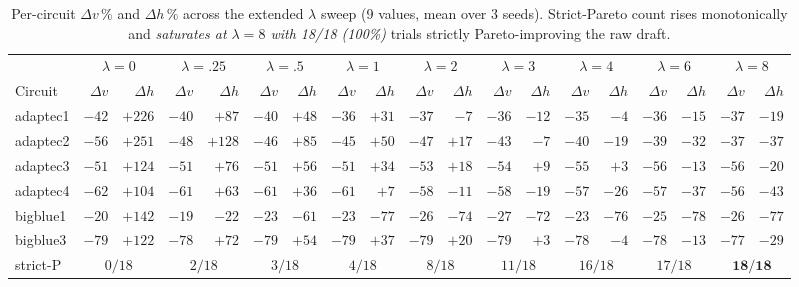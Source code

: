 \documentclass{article}
\begin{document}
\begin{table}[h]
\centering
\scriptsize
\setlength{\tabcolsep}{2pt}
\begin{tabular}{lrr|rr|rr|rr|rr|rr|rr|rr|rr}
\toprule
& \multicolumn{2}{c|}{$\lambda{=}0$} & \multicolumn{2}{c|}{$\lambda{=}.25$} &
\multicolumn{2}{c|}{$\lambda{=}.5$} & \multicolumn{2}{c|}{$\lambda{=}1$} &
\multicolumn{2}{c|}{$\lambda{=}2$} & \multicolumn{2}{c|}{$\lambda{=}3$} &
\multicolumn{2}{c|}{$\lambda{=}4$} & \multicolumn{2}{c|}{$\lambda{=}6$} &
\multicolumn{2}{c}{$\lambda{=}8$} \\
Circuit & $\Delta v$ & $\Delta h$ & $\Delta v$ & $\Delta h$ &
$\Delta v$ & $\Delta h$ & $\Delta v$ & $\Delta h$ &
$\Delta v$ & $\Delta h$ & $\Delta v$ & $\Delta h$ &
$\Delta v$ & $\Delta h$ & $\Delta v$ & $\Delta h$ &
$\Delta v$ & $\Delta h$ \\
\midrule
adaptec1 & $-42$ & $+226$ & $-40$ & $+87$ & $-40$ & $+48$ & $-36$ & $+31$ & $-37$ & $-7$ & $-36$ & $-12$ & $-35$ & $-4$ & $-36$ & $-15$ & $-37$ & $-19$ \\
adaptec2 & $-56$ & $+251$ & $-48$ & $+128$ & $-46$ & $+85$ & $-45$ & $+50$ & $-47$ & $+17$ & $-43$ & $-7$ & $-40$ & $-19$ & $-39$ & $-32$ & $-37$ & $-37$ \\
adaptec3 & $-51$ & $+124$ & $-51$ & $+76$ & $-51$ & $+56$ & $-51$ & $+34$ & $-53$ & $+18$ & $-54$ & $+9$ & $-55$ & $+3$ & $-56$ & $-13$ & $-56$ & $-20$ \\
adaptec4 & $-62$ & $+104$ & $-61$ & $+63$ & $-61$ & $+36$ & $-61$ & $+7$ & $-58$ & $-11$ & $-58$ & $-19$ & $-57$ & $-26$ & $-57$ & $-37$ & $-56$ & $-43$ \\
bigblue1 & $-20$ & $+142$ & $-19$ & $-22$ & $-23$ & $-61$ & $-23$ & $-77$ & $-26$ & $-74$ & $-27$ & $-72$ & $-23$ & $-76$ & $-25$ & $-78$ & $-26$ & $-77$ \\
bigblue3 & $-79$ & $+122$ & $-78$ & $+72$ & $-79$ & $+54$ & $-79$ & $+37$ & $-79$ & $+20$ & $-79$ & $+3$ & $-78$ & $-4$ & $-78$ & $-13$ & $-77$ & $-29$ \\
\midrule
strict-P & \multicolumn{2}{c|}{$0/18$} & \multicolumn{2}{c|}{$2/18$} &
\multicolumn{2}{c|}{$3/18$} & \multicolumn{2}{c|}{$4/18$} &
\multicolumn{2}{c|}{$8/18$} & \multicolumn{2}{c|}{$11/18$} &
\multicolumn{2}{c|}{$16/18$} & \multicolumn{2}{c|}{$17/18$} &
\multicolumn{2}{c}{$\mathbf{18/18}$} \\
\bottomrule
\end{tabular}
\caption{Per-circuit $\Delta v\,\%$ and $\Delta h\,\%$ across the extended
$\lambda$ sweep (9 values, mean over 3 seeds).  Strict-Pareto count rises
monotonically and \emph{saturates at $\lambda{=}8$ with 18/18 (100\%)}
trials strictly Pareto-improving the raw draft.}
\label{tab:supp-lambda}
\end{table}
\end{document}
